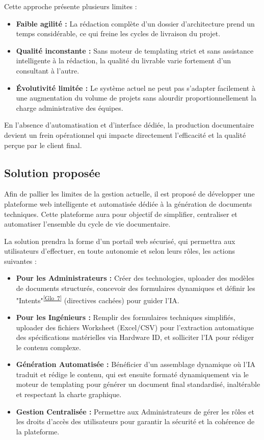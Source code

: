 \documentclass[12pt, a4paper]{report}
\newcommand{\gloref}[1]{\textsuperscript{\hyperlink{glo:#1}{[Glo~#1]}}}
\begin{document}
Cette approche présente plusieurs limites :
\begin{itemize}
    \item \textbf{Faible agilité :} La rédaction complète d'un dossier d'architecture prend un temps considérable, ce qui freine les cycles de livraison du projet.
    \item \textbf{Qualité inconstante :} Sans moteur de templating strict et sans assistance intelligente à la rédaction, la qualité du livrable varie fortement d'un consultant à l'autre.
    \item \textbf{Évolutivité limitée :} Le système actuel ne peut pas s’adapter facilement à une augmentation du volume de projets sans alourdir proportionnellement la charge administrative des équipes.
\end{itemize}

En l’absence d’automatisation et d’interface dédiée, la production documentaire devient un frein opérationnel qui impacte directement l’efficacité et la qualité perçue par le client final.

\subsection{Solution proposée}
Afin de pallier les limites de la gestion actuelle, il est proposé de développer une plateforme web intelligente et automatisée dédiée à la génération de documents techniques. Cette plateforme aura pour objectif de simplifier, centraliser et automatiser l’ensemble du cycle de vie documentaire.

La solution prendra la forme d’un portail web sécurisé, qui permettra aux utilisateurs d’effectuer, en toute autonomie et selon leurs rôles, les actions suivantes :

\begin{itemize}
    \item \textbf{Pour les Administrateurs :} Créer des technologies, uploader des modèles de documents structurés, concevoir des formulaires dynamiques et définir les "Intents"\gloref{7} (directives cachées) pour guider l'IA.
    \item \textbf{Pour les Ingénieurs :} Remplir des formulaires techniques simplifiés, uploader des fichiers Worksheet (Excel/CSV) pour l'extraction automatique des spécifications matérielles via Hardware ID, et solliciter l'IA pour rédiger le contenu complexe.
    \item \textbf{Génération Automatisée :} Bénéficier d'un assemblage dynamique où l'IA traduit et rédige le contenu, qui est ensuite formaté dynamiquement via le moteur de templating pour générer un document final standardisé, inaltérable et respectant la charte graphique.
    \item \textbf{Gestion Centralisée :} Permettre aux Administrateurs de gérer les rôles et les droits d’accès des utilisateurs pour garantir la sécurité et la cohérence de la plateforme.
\end{itemize}
\end{document}
